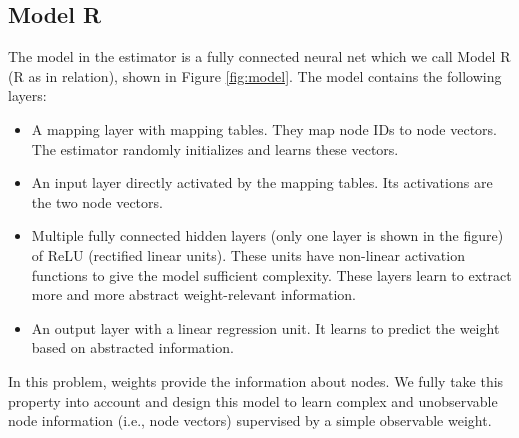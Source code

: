 \documentclass[letterpaper]{article}
\begin{document}
\subsection{Model R}
The model in the estimator is a fully connected neural net which we call Model 
R (R as in relation), shown in Figure \ref{fig:model}.
The model contains the following layers:
\begin{itemize}
	\item A mapping layer with mapping tables.
	They map node IDs to node vectors.
	The estimator randomly initializes and learns these vectors.
	\item An input layer directly activated by the mapping tables.
	Its activations are the two node vectors.
	\item Multiple fully connected hidden layers
	(only one layer is shown in the	figure) of ReLU (rectified linear units).
	These units have non-linear activation functions to give the model 
	sufficient complexity.
	These layers learn to extract more and more abstract weight-relevant 
	information.
	\item An output layer with a linear regression unit.
	It learns to predict the weight based on abstracted information.
\end{itemize}
In this problem, weights provide the information about nodes.
We fully take this property into account and design this model to learn 
complex and unobservable node information (i.e., node vectors) 
supervised by a simple observable weight.
\end{document}
